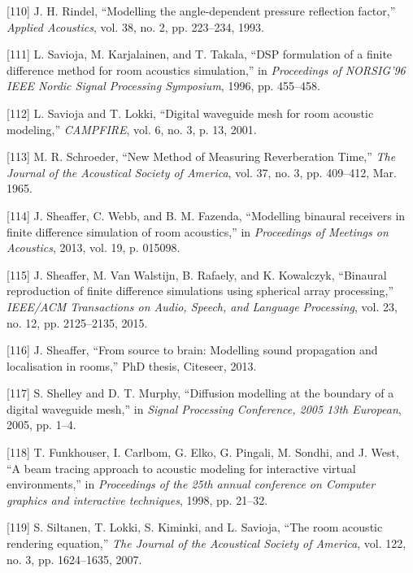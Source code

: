 \documentclass[]{scrreprt}
\begin{document}
\hypertarget{ref-rindelux5fmodellingux5f1993}{}
{[}110{]} J. H. Rindel, ``Modelling the angle-dependent pressure
reflection factor,'' \emph{Applied Acoustics}, vol. 38, no. 2, pp.
223--234, 1993.

\hypertarget{ref-saviojaux5fdspux5f1996}{}
{[}111{]} L. Savioja, M. Karjalainen, and T. Takala, ``DSP formulation
of a finite difference method for room acoustics simulation,'' in
\emph{Proceedings of NORSIG'96 IEEE Nordic Signal Processing Symposium},
1996, pp. 455--458.

\hypertarget{ref-saviojaux5fdigitalux5f2001}{}
{[}112{]} L. Savioja and T. Lokki, ``Digital waveguide mesh for room
acoustic modeling,'' \emph{CAMPFIRE}, vol. 6, no. 3, p. 13, 2001.

\hypertarget{ref-schroederux5fnewux5f1965}{}
{[}113{]} M. R. Schroeder, ``New Method of Measuring Reverberation
Time,'' \emph{The Journal of the Acoustical Society of America}, vol.
37, no. 3, pp. 409--412, Mar. 1965.

\hypertarget{ref-sheafferux5fmodellingux5f2013}{}
{[}114{]} J. Sheaffer, C. Webb, and B. M. Fazenda, ``Modelling binaural
receivers in finite difference simulation of room acoustics,'' in
\emph{Proceedings of Meetings on Acoustics}, 2013, vol. 19, p. 015098.

\hypertarget{ref-sheafferux5fbinauralux5f2015}{}
{[}115{]} J. Sheaffer, M. Van Walstijn, B. Rafaely, and K. Kowalczyk,
``Binaural reproduction of finite difference simulations using spherical
array processing,'' \emph{IEEE/ACM Transactions on Audio, Speech, and
Language Processing}, vol. 23, no. 12, pp. 2125--2135, 2015.

\hypertarget{ref-sheafferux5fsourceux5f2013}{}
{[}116{]} J. Sheaffer, ``From source to brain: Modelling sound
propagation and localisation in rooms,'' PhD thesis, Citeseer, 2013.

\hypertarget{ref-shelleyux5fdiffusionux5f2005}{}
{[}117{]} S. Shelley and D. T. Murphy, ``Diffusion modelling at the
boundary of a digital waveguide mesh,'' in \emph{Signal Processing
Conference, 2005 13th European}, 2005, pp. 1--4.

\hypertarget{ref-funkhouserux5fbeamux5f1998}{}
{[}118{]} T. Funkhouser, I. Carlbom, G. Elko, G. Pingali, M. Sondhi, and
J. West, ``A beam tracing approach to acoustic modeling for interactive
virtual environments,'' in \emph{Proceedings of the 25th annual
conference on Computer graphics and interactive techniques}, 1998, pp.
21--32.

\hypertarget{ref-siltanenux5froomux5f2007}{}
{[}119{]} S. Siltanen, T. Lokki, S. Kiminki, and L. Savioja, ``The room
acoustic rendering equation,'' \emph{The Journal of the Acoustical
Society of America}, vol. 122, no. 3, pp. 1624--1635, 2007.
\end{document}
